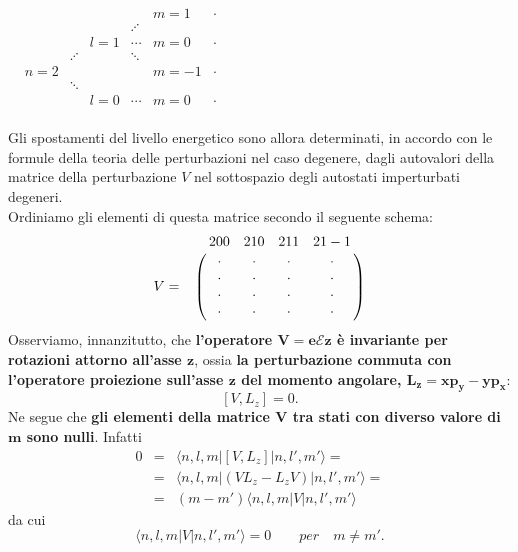 \documentclass[a4paper,12pt,oneside]{book}
\begin{document}
\begin{center}
$\begin{matrix} 
& &  &  &  & & \\
  & &  &  &  & m=1 & \cdot  \\
 &  &  &  & \iddots & &  \\
 &  &  & l=1 & \cdots & m=0 & \cdot \\
 &  & \iddots &  & \ddots & & \\
&  n=2 &  &  &  & m=-1 & \cdot \\
 &  & \ddots  & &  &  & \\
 &   &  & l=0 & \cdots & m=0 & \cdot \\
 & &  &  &  & & 
 \end{matrix}$ 
\end{center} 
\vspace{1cm}
Gli spostamenti del livello energetico sono allora determinati, in accordo con le formule della teoria delle perturbazioni nel caso degenere, dagli autovalori della matrice della perturbazione $V$ nel sottospazio degli autostati imperturbati degeneri. \\ Ordiniamo gli elementi di questa matrice secondo il seguente schema:
\begin{equation}  
V=
\bordermatrix{~&200&210&211&21-1\cr
& \cdot & \cdot & \cdot & \cdot \cr
& \cdot & \cdot & \cdot & \cdot \cr
& \cdot & \cdot & \cdot & \cdot \cr
& \cdot & \cdot & \cdot & \cdot \cr}
\end{equation}
Osserviamo, innanzitutto, che \textbf{l'operatore $\boldsymbol{V=e\mathcal{E}z}$ è invariante per rotazioni attorno all'asse $\boldsymbol{z}$}, ossia \textbf{la perturbazione commuta con l'operatore proiezione sull'asse $\boldsymbol{z}$ del momento angolare, $\boldsymbol{L_z=xp_y-yp_x}$}:
\begin{equation} 
\left[V,L_z\right]=0.
\end{equation}
Ne segue che \textbf{gli elementi della matrice $\boldsymbol{V}$ tra stati con diverso valore di $\boldsymbol{m}$ sono nulli}. Infatti 
\begin{eqnarray} 
0 & = & \langle n,l,m| \left[V,L_z\right] |n,l',m'\rangle= \nonumber \\
 & = &\langle n,l,m | \left(VL_z-L_zV\right)|n,l',m'\rangle= \nonumber \\
 & = &\left( m-m' \right) \langle n,l,m |V |n,l',m'\rangle
\end{eqnarray}
da cui
\begin{equation}
\langle n,l,m | V |n,l',m'\rangle=0 \qquad per \quad m \neq m'.
\end{equation}
\end{document}
